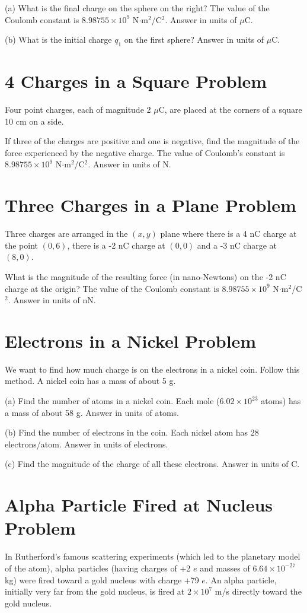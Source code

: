 \documentclass[../physics12.tex]{subfiles}
\begin{document}
(a) What is the final charge on the sphere on the right? The value of the Coulomb constant is $8.98755\times 10^9$ N$\cdot$m$^2$/C$^2$. Answer in units of $\mu$C.

(b) What is the initial charge $q_1$ on the first sphere? Answer in units of $\mu$C.

\section{4 Charges in a Square Problem}
Four point charges, each of magnitude 2 $\mu$C, are placed at the corners of a square 10 cm on a side. 

If three of the charges are positive and one is negative, find the magnitude of the force experienced by the negative charge. 
The value of Coulomb's constant is $8.98755\times 10^9$ N$\cdot$m$^2$/C$^2$. Answer in units of N.

\section{Three Charges in a Plane Problem}
Three charges are arranged in the $(x,y)$ plane where there is a 4 nC charge at the point $(0,6)$, there is a -2 nC charge at $(0,0)$ and a -3 nC charge at $(8,0)$.

What is the magnitude of the resulting force (in nano-Newtons) on the -2 nC charge at the origin? The value of the Coulomb constant is $8.98755\times 10^9$ N$\cdot$m$^2$/C$^2$. Answer in units of nN. 

\section{Electrons in a Nickel Problem}
We want to find how much charge is on the electrons in a nickel coin. Follow this method. A nickel coin has a mass of about 5 g.

(a) Find the number of atoms in a nickel coin. Each mole ($6.02\times 10^{23}$ atoms) has a mass of about 58 g. Answer in units of atoms.

(b) Find the number of electrons in the coin. Each nickel atom has 28 electrons/atom. Answer in units of electrons.

(c) Find the magnitude of the charge of all these electrons. Answer in units of C.

\section{Alpha Particle Fired at Nucleus Problem}
In Rutherford's famous scattering experiments (which led to the planetary model of the atom), alpha particles (having charges of +2 $e$ and masses of $6.64\times 10^{-27}$ kg) were 
fired toward a gold nucleus with charge +79 $e$. An alpha particle, initially very far from the gold nucleus, is fired at $2\times 10^7$ m/s directly toward the gold nucleus.
\end{document}
